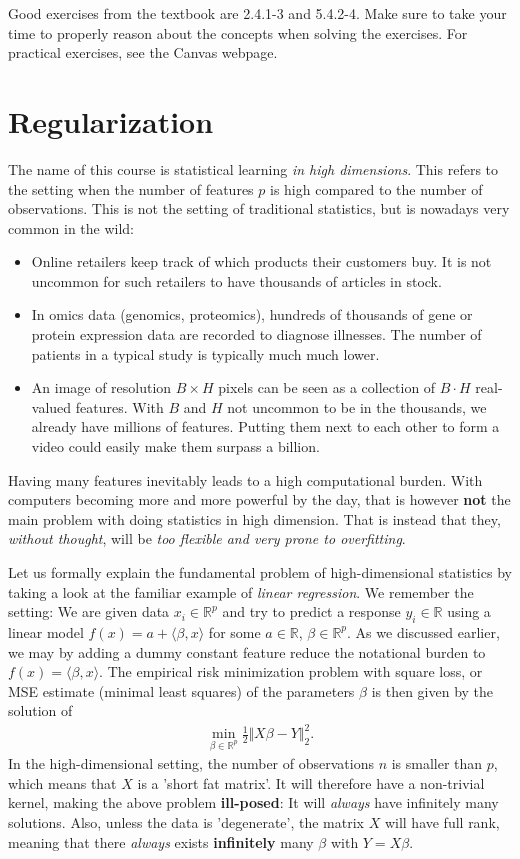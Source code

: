 \documentclass{article}
\newcommand{\sprod}[1]{\langle #1 \rangle}
\newcommand{\R}{\mathbb{R}}
\newcommand{\norm}[1]{\Vert #1 \Vert}
\begin{document}
Good exercises from the textbook are 2.4.1-3 and 5.4.2-4. Make sure to take your time to properly reason about the concepts when solving the exercises. For practical exercises, see the Canvas webpage.


\section{Regularization}

The name of this course is statistical learning \emph{in high dimensions}. This refers to the setting when the number of features $p$ is high compared to the number of observations. This is not the setting of traditional statistics, but is nowadays very common in the wild:
\begin{itemize}
    \item Online retailers keep track of which products their customers buy. It is not uncommon for such retailers to have thousands of articles in stock. 
    \item In omics data (genomics, proteomics), hundreds of thousands of gene or protein expression data are recorded to diagnose illnesses. The number of patients in a typical study is typically much much lower.
    \item An image of resolution $B\times H$ pixels can be seen as a collection of $B\cdot H$ real-valued features. With $B$ and $H$ not uncommon to be in the thousands, we already have millions of features. Putting them next to each other to form a video could easily make them surpass a billion.
\end{itemize}
Having many features inevitably leads to a high computational burden. With computers becoming more and more powerful by the day, that is however \textbf{not} the main problem with doing statistics in high dimension. That is instead that they, \emph{without thought}, will be \emph{too flexible and very prone to overfitting}.

Let us formally explain the fundamental problem of high-dimensional statistics by taking a look at the familiar example of \emph{linear regression}. We remember the setting: We are given data $x_i \in \R^p$ and try to predict a response $y_i\in \R$ using a linear model $f(x)= a+ \sprod{\beta,x}$ for some $a\in \R$, $\beta \in \R^p$. As we discussed earlier, we may by adding a dummy constant feature reduce the notational burden to $f(x)=\sprod{\beta,x}$. The empirical risk minimization problem with square loss, or MSE estimate (minimal least squares) of the parameters $\beta$ is then given by the solution of
\begin{align}
    \min_{\beta \in \R^p} \tfrac{1}{2}\norm{X\beta-Y}_2^2. \label{eq:linreg}
\end{align}
In the high-dimensional setting, the number of observations $n$ is smaller than $p$, which means that $X$ is a 'short fat matrix'. It will therefore have  a non-trivial kernel, making the above problem \textbf{ill-posed}: It will \emph{always} have infinitely many solutions. Also, unless the data is 'degenerate', the matrix $X$ will have full rank, meaning that there \emph{always} exists \textbf{infinitely} many $\beta$ with $Y=X\beta$. 
\end{document}
